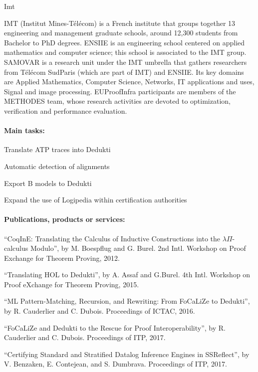 \begin{sitedescription}{Imt}


IMT (Institut Mines-T\'el\'ecom) is a French institute that groups together 13 engineering and management graduate schools, around 12,300 students from Bachelor to PhD degrees.
ENSIIE is an engineering school centered on applied mathematics and computer science; this school is associated to the IMT group. SAMOVAR is a research unit under the IMT umbrella that gathers researchers from T\'el\'ecom SudParis (which are part of IMT) and ENSIIE. Its key domains are Applied Mathematics,  Computer Science, Networks, IT applications and uses, Signal and image processing. EUProofInfra participants are members of the METHODES team, whose research activities are devoted to
optimization, verification and performance evaluation.

\paragraph*{Main tasks:}

\begin{compactitem}
\item Translate ATP traces into Dedukti 
\item Automatic detection of alignments 
\item Export B models to Dedukti 
\item Expand the use of Logipedia within certification authorities  
\end{compactitem}

\paragraph*{Publications, products or services:}

\begin{compactitem}
 \item ``CoqInE: Translating the Calculus of Inductive Constructions
   into the $\lambda{}\Pi{}$-calculus Modulo'', by M. Boespflug and
   G. Burel. 2nd Intl. Workshop on Proof Exchange for Theorem Proving,
   2012.
 \item ``Translating HOL to Dedukti'', by A. Assaf and G.Burel. 4th Intl. Workshop on Proof eXchange for Theorem Proving, 2015.
 \item ``ML Pattern-Matching, Recursion, and Rewriting: From FoCaLiZe to Dedukti'', by R. Cauderlier and C. Dubois. Proceedings of ICTAC, 2016.
 \item ``FoCaLiZe and Dedukti to the Rescue for Proof Interoperability'', by R. Cauderlier and C. Dubois. Proceedings of ITP, 2017.
 \item ``Certifying Standard and Stratified Datalog Inference Engines in SSReflect'', by V. Benzaken, E. Contejean, and S. Dumbrava. Proceedings of ITP, 2017.
\end{compactitem}


\end{sitedescription}
